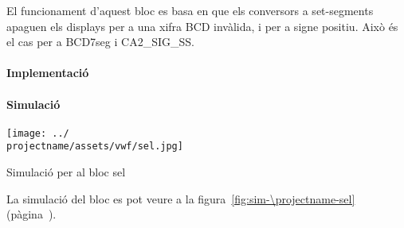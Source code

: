 El funcionament d'aquest bloc es basa en que els conversors a set-segments
apaguen els displays per a una xifra BCD invàlida, i per a signe positiu.
Això és el cas per a \textsf{BCD7seg} i \textsf{CA2\_SIG\_SS}.

\paragraph{Implementació}





\paragraph{Simulació}

\begin{contendfig}
  \begin{center}
    \texttt{[image: ../\\projectname/assets/vwf/sel.jpg]}
  \end{center}
  \caption{\label{fig:sim-\projectname-sel} Simulació per al bloc \textsf{sel}}
\end{contendfig}

La simulació del bloc es pot veure a la figura~\ref{fig:sim-\projectname-sel} (pàgina~\pageref{fig:sim-\projectname-sel}).


\vspace{1cm}
